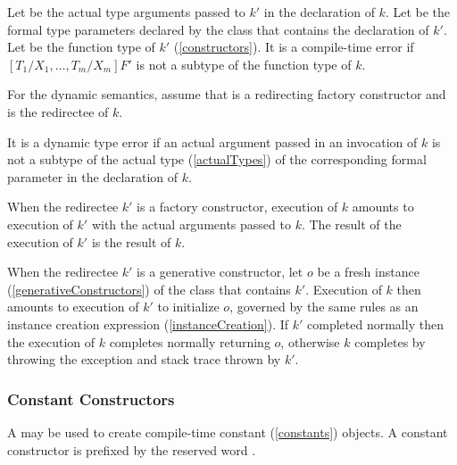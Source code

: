 \documentclass[makeidx]{article}
\begin{document}
\LMHash{}%
Let  be the actual type arguments passed to $k'$
in the declaration of $k$.
Let  be the formal type parameters declared by
the class that contains the declaration of $k'$.
Let  be the function type of $k'$ (\ref{constructors}).
It is a compile-time error if $[T_1/X_1, \ldots, T_m/X_m]F'$
is not a subtype of the function type of $k$.


\LMHash{}%
For the dynamic semantics,
assume that  is a redirecting factory constructor
and  is the redirectee of $k$.

\LMHash{}%
It is a dynamic type error if an actual argument passed in an invocation of $k$
is not a subtype of the actual type (\ref{actualTypes})
of the corresponding formal parameter in the declaration of $k$.

\LMHash{}%
When the redirectee $k'$ is a factory constructor,
execution of $k$ amounts to execution of $k'$
with the actual arguments passed to $k$.
The result of the execution of $k'$ is the result of $k$.

\LMHash{}%
When the redirectee $k'$ is a generative constructor,
let $o$ be a fresh instance (\ref{generativeConstructors})
of the class that contains $k'$.
Execution of $k$ then amounts to execution of $k'$ to initialize $o$,
governed by the same rules as an instance creation expression
(\ref{instanceCreation}).
If $k'$ completed normally then the execution of $k$
completes normally returning $o$,
otherwise $k$ completes by throwing the exception and stack trace
thrown by $k'$.


\subsubsection{Constant Constructors}

\LMHash{}%
A 
may be used to create compile-time constant (\ref{constants}) objects.
A constant constructor is prefixed by the reserved word \CONST.
\end{document}
